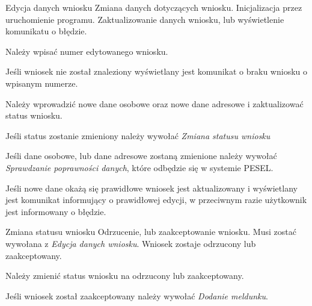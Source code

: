 \documentclass[12pt]{article}
\begin{document}
\scenario
    {Edycja danych wniosku}
    {Zmiana danych dotyczących wniosku.}
    {Inicjalizacja przez uruchomienie programu.}
    {Zaktualizowanie danych wniosku, lub wyświetlenie komunikatu o błędzie.}
    {
        \item Należy wpisać numer edytowanego wniosku.
        \item Jeśli wniosek nie został znaleziony wyświetlany jest komunikat o braku wniosku o wpisanym numerze.
        \item Należy wprowadzić nowe dane osobowe oraz nowe dane adresowe i zaktualizować status wniosku.
        \item Jeśli status zostanie zmieniony należy wywołać \textit{Zmiana statusu wniosku}
        \item Jeśli dane osobowe, lub dane adresowe zostaną zmienione należy wywołać \textit{Sprawdzanie poprawności danych}, które odbędzie się w systemie PESEL.
        \item Jeśli nowe dane okażą się prawidłowe wniosek jest aktualizowany i wyświetlany jest komunikat informujący o prawidłowej edycji, w przeciwnym razie użytkownik jest informowany o błędzie.
    }

\scenario
    {Zmiana statusu wniosku}
    {Odrzucenie, lub zaakceptowanie wniosku.}
    {Musi zostać wywołana z \textit{Edycja danych wniosku}.}
    {Wniosek zostaje odrzucony lub zaakceptowany.}
    {
        \item Należy zmienić status wniosku na odrzucony lub zaakceptowany.
        \item Jeśli wniosek został zaakceptowany należy wywołać \textit{Dodanie meldunku}.
    }
\end{document}
